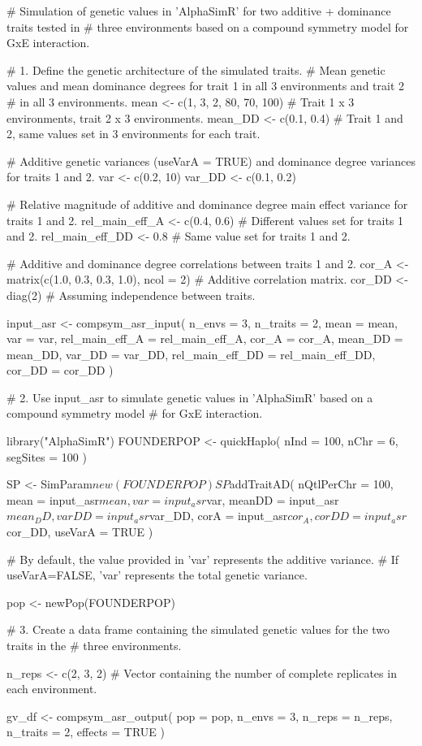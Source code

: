 \documentclass[a4paper]{book}
\begin{document}
\begin{Examples}
\begin{ExampleCode}
# Simulation of genetic values in 'AlphaSimR' for two additive + dominance traits tested in
# three environments based on a compound symmetry model for GxE interaction.

# 1. Define the genetic architecture of the simulated traits.
# Mean genetic values and mean dominance degrees for trait 1 in all 3 environments and trait 2
# in all 3 environments.
mean <- c(1, 3, 2, 80, 70, 100) # Trait 1 x 3 environments, trait 2 x 3 environments.
mean_DD <- c(0.1, 0.4) # Trait 1 and 2, same values set in 3 environments for each trait.

# Additive genetic variances (useVarA = TRUE) and dominance degree variances for traits 1 and 2.
var <- c(0.2, 10)
var_DD <- c(0.1, 0.2)

# Relative magnitude of additive and dominance degree main effect variance for traits 1 and 2.
rel_main_eff_A <- c(0.4, 0.6) # Different values set for traits 1 and 2.
rel_main_eff_DD <- 0.8 # Same value set for traits 1 and 2.

# Additive and dominance degree correlations between traits 1 and 2.
cor_A <- matrix(c(1.0, 0.3, 0.3, 1.0), ncol = 2) # Additive correlation matrix.
cor_DD <- diag(2) # Assuming independence between traits.

input_asr <- compsym_asr_input(
  n_envs = 3,
  n_traits = 2,
  mean = mean,
  var = var,
  rel_main_eff_A = rel_main_eff_A,
  cor_A = cor_A,
  mean_DD = mean_DD,
  var_DD = var_DD,
  rel_main_eff_DD = rel_main_eff_DD,
  cor_DD = cor_DD
)


# 2. Use input_asr to simulate genetic values in 'AlphaSimR' based on a compound symmetry model
# for GxE interaction.

library("AlphaSimR")
FOUNDERPOP <- quickHaplo(
  nInd = 100,
  nChr = 6,
  segSites = 100
)

SP <- SimParam$new(FOUNDERPOP)

SP$addTraitAD(
  nQtlPerChr = 100,
  mean = input_asr$mean,
  var = input_asr$var,
  meanDD = input_asr$mean_DD,
  varDD = input_asr$var_DD,
  corA = input_asr$cor_A,
  corDD = input_asr$cor_DD,
  useVarA = TRUE
)

# By default, the value provided in 'var' represents the additive variance.
# If useVarA=FALSE, 'var' represents the total genetic variance.

pop <- newPop(FOUNDERPOP)


# 3. Create a data frame containing the simulated genetic values for the two traits in the
# three environments.

n_reps <- c(2, 3, 2) # Vector containing the number of complete replicates in each environment.

gv_df <- compsym_asr_output(
  pop = pop,
  n_envs = 3,
  n_reps = n_reps,
  n_traits = 2,
  effects = TRUE
)
\end{ExampleCode}
\end{Examples}
\end{document}
